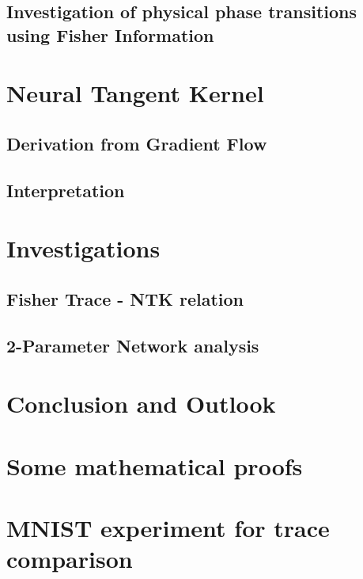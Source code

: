 \documentclass[12pt, twoside, a4paper]{report}
\begin{document}
	\section{Investigation of physical phase transitions using Fisher Information}\label{sec:FIPhysics}
	
	
	
	\chapter{Neural Tangent Kernel}\label{sec:ChapterNTK}
	
	\section{Derivation from Gradient Flow}\label{sec:NTKderivation}
	
	\section{Interpretation}\label{sec:NTKInterpretation}
	
	
	\chapter{Investigations}\label{sec:ChapterResults}
	\section{Fisher Trace - NTK relation}\label{sec:Results1}
	
	\section{2-Parameter Network analysis}\label{sec:Results2}
	
	
	\chapter{Conclusion and Outlook}\label{sec:ChapterConcAndOutlook}
	
	
	
	
	\nocite{*}
	\printbibliography[title=Literature]
	\begin{appendices}
		\chapter{Some mathematical proofs}
		
		\chapter{MNIST experiment for trace comparison}
		\label{sec:TraceExperimentAppendix}
		
	\end{appendices}
	
\end{document}
